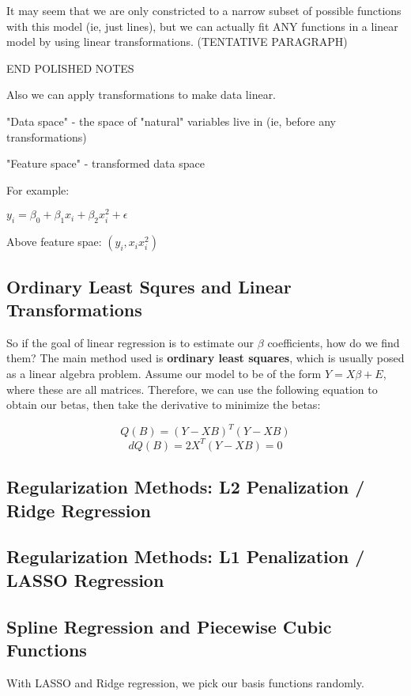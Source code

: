 \documentclass[12pt]{article}
\begin{document}
It may seem that we are only constricted to a narrow subset of possible functions with this model (ie, just lines), but we can actually fit ANY functions in a linear model by using linear transformations. (TENTATIVE PARAGRAPH)






END POLISHED NOTES 

Also we can apply transformations to make data linear.

"Data space" - the space of "natural" variables live in (ie, before any transformations)

"Feature space" - transformed data space

For example:

$y_i = \beta_0 + \beta_1 x_i + \beta_2x_i^2 + \epsilon $

Above feature spae: $(y_i, x_i x_i^2)$


\subsection{Ordinary Least Squres and Linear Transformations}
So if the goal of linear regression is to estimate our $\beta$ coefficients, how do we find them? The main method used is \textbf{ordinary least squares}, which is usually posed as a linear algebra problem. Assume our model to be of the form $Y = X\beta + E$, where these are all matrices. Therefore, we can use the following equation to obtain our betas, then take the derivative to minimize the betas:

$$Q(B) = (Y - XB)^T(Y-XB)$$
$$dQ(B) = 2X^T(Y - XB) = 0$$



\subsection{Regularization Methods: L2 Penalization / Ridge Regression}

\subsection{Regularization Methods: L1 Penalization / LASSO Regression}

\subsection{Spline Regression and Piecewise Cubic Functions}
With LASSO and Ridge regression, we pick our basis functions randomly.
\end{document}
